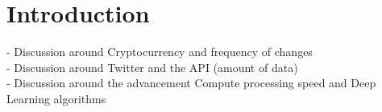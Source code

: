 \chapter{Introduction}
- Discussion around Cryptocurrency and frequency of changes \\
- Discussion around Twitter and the API (amount of data) \\
- Discussion around the advancement Compute processing speed and Deep Learning algorithms

